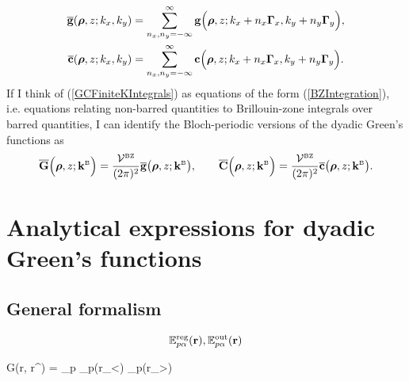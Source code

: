 \documentclass[letterpaper]{article}
\newcommand{\vbGamma}{\boldsymbol{\Gamma}}
\begin{document}
\begin{align*}
 \overline{\vb g}(\vbrho, z; k_x, k_y)
 &= \sum_{n_x, n_y=-\infty}^{\infty}
     \vb g\Big(\vbrho, z; k_x + n_x\vbGamma_x, k_y + n_y \vbGamma_y\Big), 
\\
 \overline{\vb c}(\vbrho, z; k_x, k_y) 
 &= \sum_{n_x, n_y=-\infty}^{\infty}
     \vb c\Big(\vbrho, z; k_x + n_x\vbGamma_x, k_y + n_y \vbGamma_y\Big).
\end{align*}
If I think of (\ref{GCFiniteKIntegrals}) as equations of the form
(\ref{BZIntegration}), i.e. equations relating non-barred quantities
to Brillouin-zone integrals over barred quantities, I can
identify the Bloch-periodic versions of the dyadic Green's functions
as 
$$
\overline{\mathbf{G}}\Big(\boldsymbol{\rho}, z; \mathbf{k}^{\hbox{\tiny{B}}}\Big)
=\frac{\mathcal{V}^{\hbox{\tiny{BZ}}}}{(2\pi)^2}
  \overline{\mathbf{g}}\big(\boldsymbol{\rho}, z; \mathbf{k}^{\hbox{\tiny{B}}}\big), 
\qquad
\overline{\mathbf{C}}\Big(\boldsymbol{\rho}, z; \mathbf{k}^{\hbox{\tiny{B}}}\Big)
=\frac{\mathcal{V}^{\hbox{\tiny{BZ}}}}{(2\pi)^2}
  \overline{\mathbf{c}}\big(\boldsymbol{\rho}, z; \mathbf{k}^{\hbox{\tiny{B}}}\big).
$$

\newpage
\newcommand{\EE}{\mathbb{E}}
\section{Analytical expressions for dyadic Green's functions}

\subsection{General formalism}

$$ \EE\sups{reg}_{p\alpha}(\vb r), \EE\sups{out}_{p\alpha}(\vb r)$$

{ \vb G(\vb r, \vb r^\prime) 
  =
  \sum_{p\alpha}
  \EE{}_{p\alpha}(\vb r_<) \EE{}_{p\alpha}(\vb r_>)
}
\end{document}
